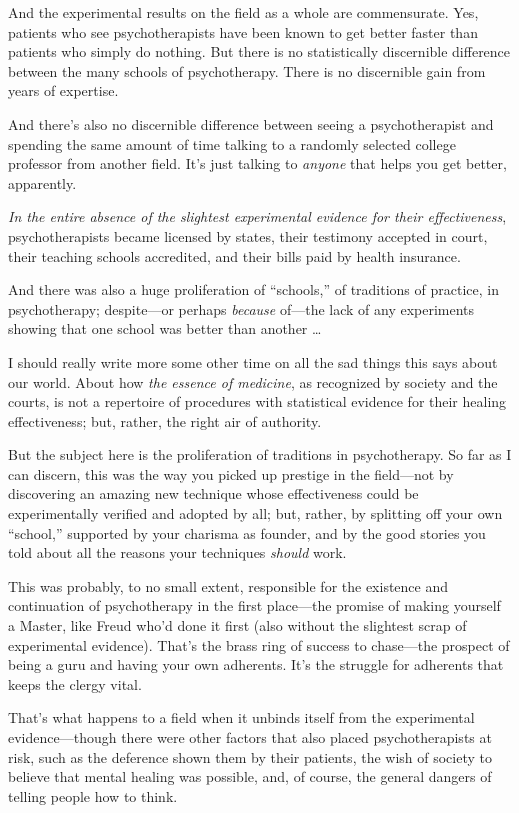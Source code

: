 {
 And the experimental results on the field as a whole are
commensurate. Yes, patients who see psychotherapists have been known to
get better faster than patients who simply do nothing. But there is no
statistically discernible difference between the many schools of
psychotherapy. There is no discernible gain from years of expertise.}

{
 And there's also no discernible difference between
seeing a psychotherapist and spending the same amount of time talking
to a randomly selected college professor from another field.
It's just talking to \textit{anyone} that helps you get
better, apparently.}

{
 \textit{In the entire absence of the slightest experimental
evidence for their effectiveness}, psychotherapists became licensed by
states, their testimony accepted in court, their teaching schools
accredited, and their bills paid by health insurance.}

{
 And there was also a huge proliferation of
``schools,'' of traditions of
practice, in psychotherapy; despite---or perhaps \textit{because}
of---the lack of any experiments showing that one school was better
than another \ldots}

{
 I should really write more some other time on all the sad things
this says about our world. About how \textit{the essence of medicine},
as recognized by society and the courts, is not a repertoire of
procedures with statistical evidence for their healing effectiveness;
but, rather, the right air of authority.}

{
 But the subject here is the proliferation of traditions in
psychotherapy. So far as I can discern, this was the way you picked up
prestige in the field---not by discovering an amazing new technique
whose effectiveness could be experimentally verified and adopted by
all; but, rather, by splitting off your own
``school,'' supported by your
charisma as founder, and by the good stories you told about all the
reasons your techniques \textit{should} work.}

{
 This was probably, to no small extent, responsible for the
existence and continuation of psychotherapy in the first place---the
promise of making yourself a Master, like Freud who'd
done it first (also without the slightest scrap of experimental
evidence). That's the brass ring of success to
chase---the prospect of being a guru and having your own adherents.
It's the struggle for adherents that keeps the clergy
vital.}

{
 That's what happens to a field when it unbinds
itself from the experimental evidence---though there were other factors
that also placed psychotherapists at risk, such as the deference shown
them by their patients, the wish of society to believe that mental
healing was possible, and, of course, the general dangers of telling
people how to think.}

